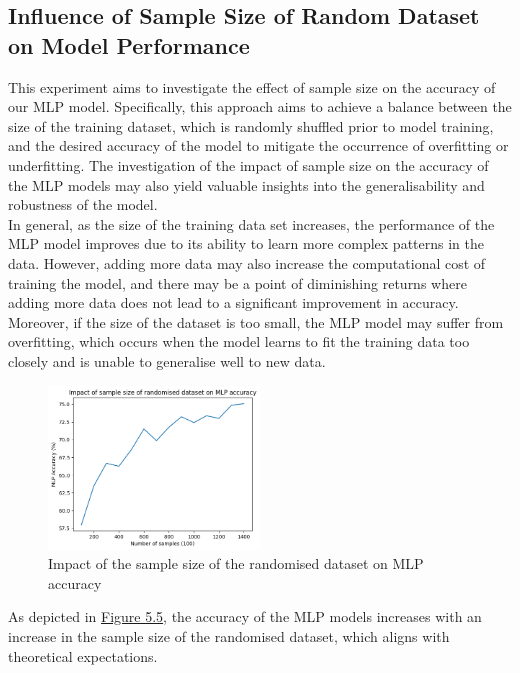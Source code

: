 \documentclass[11pt, a4paper]{report}
\begin{document}
\subsection{Influence of Sample Size of Random Dataset on Model Performance}\label{sec:5.4.2}
This experiment aims to investigate the effect of sample size on the accuracy of our MLP model. Specifically, this approach aims to achieve a balance between the size of the training dataset, which is randomly shuffled prior to model training, and the desired accuracy of the model to mitigate the occurrence of overfitting or underfitting. The investigation of the impact of sample size on the accuracy of the MLP models may also yield valuable insights into the generalisability and robustness of the model.\\

In general, as the size of the training data set increases, the performance of the MLP model improves due to its ability to learn more complex patterns in the data. However, adding more data may also increase the computational cost of training the model, and there may be a point of diminishing returns where adding more data does not lead to a significant improvement in accuracy. Moreover, if the size of the dataset is too small, the MLP model may suffer from overfitting, which occurs when the model learns to fit the training data too closely and is unable to generalise well to new data.
\begin{figure}[H]
    \centering 
    \includegraphics[width=0.5\textwidth]{docs/Project Report/Media/5_5_2_size_vs_accuracy.png}
    \caption{Impact of the sample size of the randomised dataset on MLP accuracy}
    \label{fig:5.5}
\end{figure}
As depicted in \hyperref[fig:5.5]{Figure 5.5}, the accuracy of the MLP models increases with an increase in the sample size of the randomised dataset, which aligns with theoretical expectations.



\end{document}
